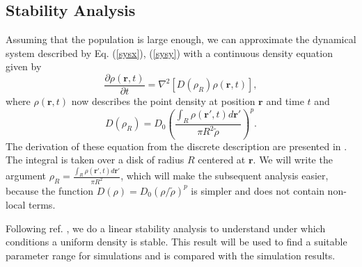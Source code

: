 \documentclass{article}
\renewcommand{\vec}[1]{\boldsymbol{#1}}
\begin{document}
\subsection{Stability Analysis}
Assuming that the population is large enough, we can approximate the dynamical system described by Eq. (\ref{sysx}), (\ref{sysy}) with a continuous density equation given by
\begin{equation} \label{pde}
    \frac{\partial\rho(\vec{r},t)}{\partial t} = \nabla^2[D(\rho_R)\rho(\vec{r},t)],
\end{equation}
where $\rho(\vec{r},t)$ now describes the point density at position $\vec{r}$ and time $t$ and
\begin{equation}
    D(\rho_R) = D_0 \left(\frac{\int_{R} \rho(\vec{r}',t)d\vec{r}'}{\pi R^2 \tilde{\rho}}\right)^p.
\end{equation}
The derivation of these equation from the discrete description are presented in \autocite{lopezMacroscopicDescriptionParticle2006}.
The integral is taken over a disk of radius $R$ centered at $\vec{r}$. 
We will write the argument $\rho_R = \frac{\int_{R} \rho(\vec{r}',t)d\vec{r}'}{\pi R^2}$, which will make the subsequent analysis easier, because the function $D(\rho)=D_0 (\rho/\tilde{\rho})^p$ is simpler and does not contain non-local terms.

Following ref. \cite{lopezMacroscopicDescriptionParticle2006}, we do a linear stability analysis to understand under which conditions a uniform density is stable. 
This result will be used to find a suitable parameter range for simulations and is compared with the simulation results.
\end{document}
